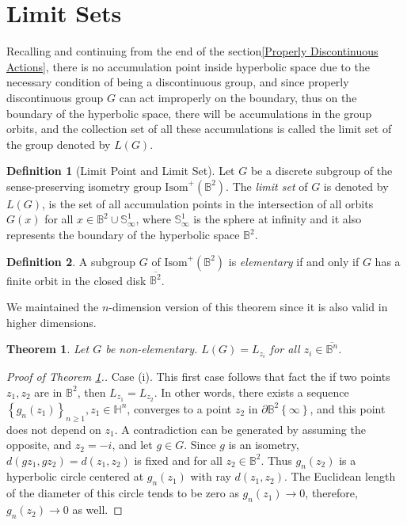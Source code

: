 \documentclass[12pt,oneside]{sfsuthesis}
\theoremstyle{plain} %
\newtheorem{theorem}{Theorem}[chapter]
\theoremstyle{definition}  %
\newtheorem{definition}{Definition}[chapter]
\theoremstyle{remark}  %
\theoremstyle{plain}
\begin{document}
{\section{Limit Sets}

Recalling and continuing from the end of the section\ref{Properly Discontinuous Actions}, there is no accumulation point inside hyperbolic space due to the necessary condition of being a discontinuous group, and since properly discontinuous group $G$ can act improperly on the boundary, thus on the boundary of the hyperbolic space, there will be accumulations in the group orbits, and the collection set of all these accumulations is called the limit set of the group denoted by $L(G)$.

\begin{definition}[Limit Point and Limit Set]\cite{ahlfors1981mobius}
Let $G$ be a discrete subgroup of the sense-preserving isometry group $\text{Isom}^+(\mathbb{B}^{2})$. The \textit{limit set} of $G$ is denoted by $L(G)$, is the set of all accumulation points in the intersection of all orbits $G(x)$ for all $x\in \mathbb{B}^2\cup \mathbb{S}^{1}_\infty$, where $\mathbb{S}^{1}_\infty$ is the sphere at infinity and it also represents the boundary of the hyperbolic space $\mathbb{B}^{2}$.

\end{definition}

\begin{definition}\label{elementary}
A subgroup $G$ of $\text{Isom}^+(\mathbb{B}^{2})$ is \textit{elementary} if and only if $G$ has a finite orbit in the closed disk $\overline{\mathbb{B}^{2}}$.
\end{definition}


We maintained the $n$-dimension version of this theorem since it is also valid in higher dimensions.

\begin{theorem}\cite[P.80]{ahlfors1981mobius}\label{ahlfors thm}
Let $G$ be non-elementary. $L(G)=L_{z_i}$ for all $z_i\in \overline{\mathbb{B}^n}$.
\end{theorem}

\begin{proof}[Proof of Theorem \ref{ahlfors thm}.\cite{ahlfors1981mobius, ratcliffe1994foundations, dal2010geodesic}]
Case (i). This first case follows that fact the if two points $z_1,z_2$ are in $\mathbb{B}^2$, then $L_{z_1}=L_{z_2}$. In other words, there exists a sequence $\left\lbrace g_n(z_1)\right\rbrace_{n\geq 1}, z_1\in\mathbb{H}^n$, converges to a point $z_2$ in $\partial \mathbb{B}^2 \left\lbrace \infty\right\rbrace$, and this point does not depend on $z_1$. A contradiction can be generated by assuming the opposite, and $z_2=-i$, and let $g\in G$. Since $g$ is an isometry, $d(gz_1,gz_2)=d(z_1,z_2)$ is fixed and for all $z_2\in \mathbb{B}^2$. Thus $g_n(z_2)$ is a hyperbolic circle centered at $g_n(z_1)$ with ray $d(z_1,z_2)$. The Euclidean length of the diameter of this circle tends to be zero as $g_n(z_1)\to 0$, therefore, $g_n(z_2)\to 0$ as well.



\end{proof}}
\end{document}
